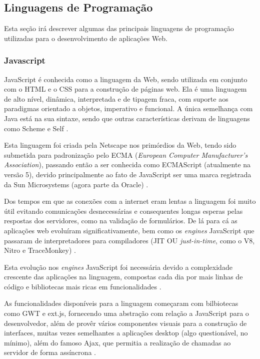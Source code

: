 \documentclass[diss]{template/setrem}
\begin{document}
\subsection{Linguagens de Programação}
Esta seção irá descrever algumas das principais linguagens de programação utilizadas para o desenvolvimento de aplicações Web.

\subsubsection{Javascript}
JavaScript é conhecida como a linguagem da Web, sendo utilizada em conjunto com o HTML e o CSS para a construção de páginas web. Ela é uma linguagem de alto nível, dinâmica, interpretada e de tipagem fraca, com suporte aos paradigmas orientado a objetos, imperativo e funcional. A única semelhança com Java está na sua sintaxe, sendo que outras características derivam de linguagens como Scheme e Self \citep{Flanagan2011}.

Esta linguagem foi criada pela Netscape nos primórdios da Web, tendo sido submetida para padronização pelo ECMA (\emph{European Computer Manufacturer's Association}), passando então a ser conhecida como ECMAScript (atualmente na versão 5), devido principalmente ao fato de JavaScript ser uma marca registrada da Sun Microsystems (agora parte da Oracle) \citep{Flanagan2011}.

Dos tempos em que as conexões com a internet eram lentas a linguagem foi muito útil evitando comunicações desnecessárias e consequentes longas esperas pelas respostas dos servidores, como na validação de formulários. De lá para cá as aplicações web evoluíram significativamente, bem como os \emph{engines} JavaScript que passaram de interpretadores para compiladores (JIT OU \emph{just-in-time}, como o V8, Nitro e TraceMonkey) \citep{Zakas2010}.

Esta evolução nos \emph{engines} JavaScript foi necessária devido a complexidade crescente das aplicações na linguagem, compostas cada dia por mais linhas de código e bibliotecas mais ricas em funcionalidades \citep{Zakas2010, MacCaw2011}.

As funcionalidades disponíveis para a linguagem começaram com bilbiotecas como GWT e ext.js, fornecendo uma abstração com relação a JavaScript para o desenvolvedor, além de provêr vários componentes visuais para a construção de interfaces, muitas vezes semelhantes a aplicações desktop (algo questionável, no mínimo), além do famoso Ajax, que permitia a realização de chamadas ao servidor de forma assíncrona \citep{North2011}.
\end{document}
